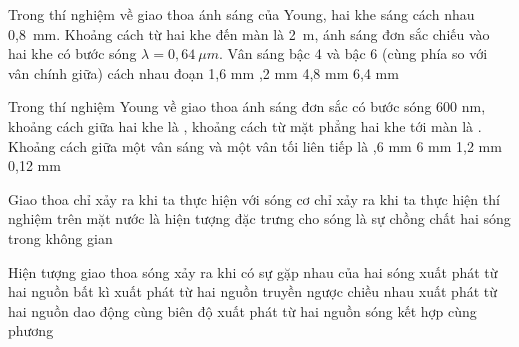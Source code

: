 \begin{ex}%
Trong thí nghiệm về giao thoa ánh sáng của Young, hai khe sáng cách nhau 0,8\ mm. Khoảng cách từ hai khe đến màn là 2\ m, ánh sáng đơn sắc chiếu vào hai khe có bước sóng $\lambda =0,64\ \mu m$. Vân sáng bậc 4 và bậc 6 (cùng phía so với vân chính giữa) cách nhau đoạn
\choice
{1,6 mm}
{,2 mm}
{4,8 mm}
{6,4 mm}
\end{ex} 
\begin{ex}%
Trong thí nghiệm Young về giao thoa ánh sáng đơn sắc có bước sóng 600 nm, khoảng cách giữa hai khe là , khoảng cách từ mặt phẳng hai khe tới màn là . Khoảng cách giữa một vân sáng và một vân tối liên tiếp là
\choice
{,6 mm}
{6 mm}
{1,2 mm}
{0,12 mm}
\end{ex} 





\begin{ex}%
Giao thoa
\choice
{chỉ xảy ra khi ta thực hiện với sóng cơ}
{chỉ xảy ra khi ta thực hiện thí nghiệm trên mặt nước}
{\True là hiện tượng đặc trưng cho sóng}
{là sự chồng chất hai sóng trong không gian}
\end{ex} 
\begin{ex}%
Hiện tượng giao thoa sóng xảy ra khi có sự gặp nhau của hai sóng
\choice
{xuất phát từ hai nguồn bất kì}
{xuất phát từ hai nguồn truyền ngược chiều nhau}
{xuất phát từ hai nguồn dao động cùng biên độ}
{\True xuất phát từ hai nguồn sóng kết hợp cùng phương}
\end{ex} 







